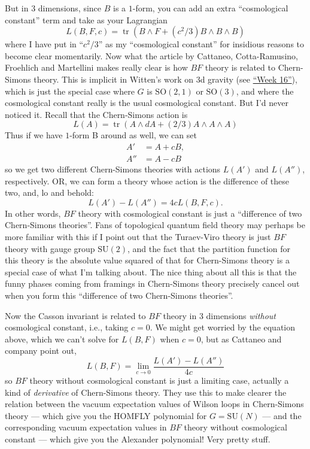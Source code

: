 \documentclass{article}
\begin{document}
But in 3 dimensions, since \(B\) is a \(1\)-form, you can add an extra
``cosmological constant'' term and take as your Lagrangian
\[L(B,F,c) = \operatorname{tr}(B \wedge F + (c^2/3) B \wedge B \wedge B)\]
where I have put in ``\(c^2/3\)'' as my ``cosmological constant'' for
insidious reasons to become clear momentarily. Now what the article by
Cattaneo, Cotta-Ramusino, Froehlich and Martellini makes really clear is
how \(BF\) theory is related to Chern-Simons theory. This is implicit in
Witten's work on 3d gravity (see \protect\hyperlink{week16}{``Week
16''}), which is just the special case where \(G\) is
\(\mathrm{SO}(2,1)\) or \(\mathrm{SO}(3)\), and where the cosmological
constant really is the usual cosmological constant. But I'd never
noticed it. Recall that the Chern-Simons action is
\[L(A) = \operatorname{tr}(A \wedge dA + (2/3)A \wedge A \wedge A)\]
Thus if we have \(1\)-form B around as well, we can set \[
  \begin{aligned}
    A' &= A + cB,
  \\A'' &= A - cB
  \end{aligned}
\] so we get two different Chern-Simons theories with actions \(L(A')\)
and \(L(A'')\), respectively. OR, we can form a theory whose action is
the difference of these two, and, lo and behold:
\[L(A') - L(A'') = 4cL(B,F,c).\] In other words, \(BF\) theory with
cosmological constant is just a ``difference of two Chern-Simons
theories''. Fans of topological quantum field theory may perhaps be more
familiar with this if I point out that the Turaev-Viro theory is just
\(BF\) theory with gauge group \(\mathrm{SU}(2)\), and the fact that the
partition function for this theory is the absolute value squared of that
for Chern-Simons theory is a special case of what I'm talking about. The
nice thing about all this is that the funny phases coming from framings
in Chern-Simons theory precisely cancel out when you form this
``difference of two Chern-Simons theories''.

Now the Casson invariant is related to \(BF\) theory in 3 dimensions
\emph{without} cosmological constant, i.e., taking \(c = 0\). We might
get worried by the equation above, which we can't solve for \(L(B,F)\)
when \(c = 0\), but as Cattaneo and company point out,
\[L(B,F) = \lim_{c\to0}\frac{L(A')-L(A'')}{4c}\] so \(BF\) theory
without cosmological constant is just a limiting case, actually a kind
of \emph{derivative} of Chern-Simons theory. They use this to make
clearer the relation between the vacuum expectation values of Wilson
loops in Chern-Simons theory --- which give you the HOMFLY polynomial
for \(G = \mathrm{SU}(N)\) --- and the corresponding vacuum expectation
values in \(BF\) theory without cosmological constant --- which give you
the Alexander polynomial! Very pretty stuff.
\end{document}

